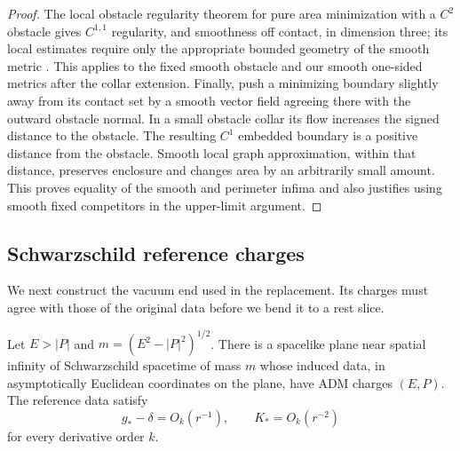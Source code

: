 \begin{proof}
The local obstacle regularity theorem for pure area minimization with
a $C^2$ obstacle gives $C^{1,1}$ regularity, and smoothness off contact,
in dimension three; its local estimates require only the appropriate
bounded geometry of the smooth metric
\cite[Regularity Theorem 1.3]{HuiskenIlmanen2001}.
This applies to the fixed smooth obstacle and our smooth one-sided
metrics after the collar extension.  Finally, push a minimizing boundary
slightly away from its contact set by a smooth vector field agreeing
there with the outward obstacle normal.  In a small obstacle collar its
flow increases the signed distance to the obstacle.  The resulting
$C^1$ embedded boundary is a positive distance from the obstacle.
Smooth local graph approximation, within that distance, preserves
enclosure and changes area by an arbitrarily small amount.  This proves
equality of the smooth and perimeter infima and also justifies using
smooth fixed competitors in the upper-limit argument.
\end{proof}

\subsection{Schwarzschild reference charges}

We next construct the vacuum end used in the replacement.  Its charges
must agree with those of the original data before we bend it to a rest
slice.

\begin{lemma}
\label{n3:reduction:boosted-reference}
Let $E>|P|$ and $m=(E^2-|P|^2)^{1/2}$.  There is a spacelike plane
near spatial infinity of Schwarzschild spacetime of mass $m$ whose
induced data, in asymptotically Euclidean coordinates on the plane,
have ADM charges $(E,P)$.  The reference data satisfy
\[
 g_*-\delta=O_k(r^{-1}),\qquad K_*=O_k(r^{-2})
\]
for every derivative order $k$.
\end{lemma}

